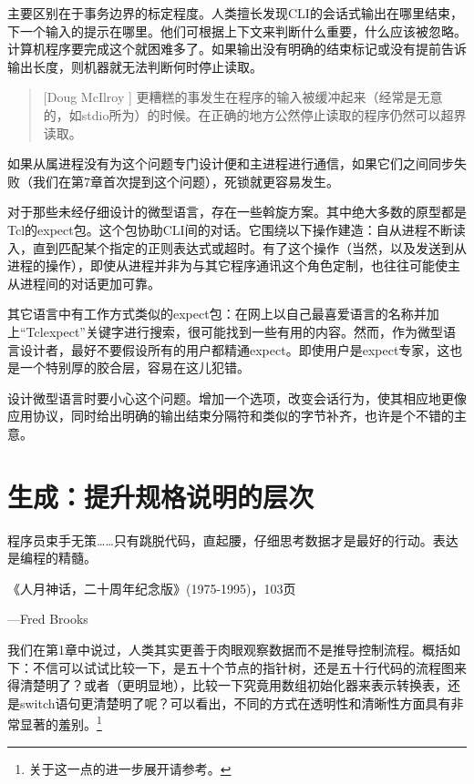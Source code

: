 \documentclass[12pt,oneside]{book}
\begin{document}
主要区别在于事务边界的标定程度。人类擅长发现CLI的会话式输出在哪里结束，下一个输入的提示在哪里。他们可根据上下文来判断什么重要，什么应该被忽略。计算机程序要完成这个就困难多了。如果输出没有明确的结束标记或没有提前告诉输出长度，则机器就无法判断何时停止读取。

\begin{quote}[Doug McIlroy 	]
更糟糕的事发生在程序的输入被缓冲起来（经常是无意的，如stdio所为）的时候。在正确的地方公然停止读取的程序仍然可以超界读取。
\end{quote}

如果从属进程没有为这个问题专门设计便和主进程进行通信，如果它们之间同步失败（我们在第7章首次提到这个问题），死锁就更容易发生。

对于那些未经仔细设计的微型语言，存在一些斡旋方案。其中绝大多数的原型都是Tcl的expect包。这个包协助CLI间的对话。它围绕以下操作建造：自从进程不断读入，直到匹配某个指定的正则表达式或超时。有了这个操作（当然，以及发送到从进程的操作），即使从进程并非为与其它程序通讯这个角色定制，也往往可能使主从进程间的对话更加可靠。

其它语言中有工作方式类似的expect包：在网上以自己最喜爱语言的名称并加上“Tclexpect”关键字进行搜索，很可能找到一些有用的内容。然而，作为微型语言设计者，最好不要假设所有的用户都精通expect。即使用户是expect专家，这也是一个特别厚的胶合层，容易在这儿犯错。

设计微型语言时要小心这个问题。增加一个选项，改变会话行为，使其相应地更像应用协议，同时给出明确的输出结束分隔符和类似的字节补齐，也许是个不错的主意。



\chapter{生成：提升规格说明的层次}
\begin{flushright}
程序员束手无策……只有跳脱代码，直起腰，仔细思考数据才是最好的行动。表达是编程的精髓。

《人月神话，二十周年纪念版》(1975-1995)，103页

{\hfill —Fred Brooks}
\end{flushright}

我们在第1章中说过，人类其实更善于肉眼观察数据而不是推导控制流程。概括如下：不信可以试试比较一下，是五十个节点的指针树，还是五十行代码的流程图来得清楚明了？或者（更明显地），比较一下究竟用数组初始化器来表示转换表，还是switch语句更清楚明了呢？可以看出，不同的方式在透明性和清晰性方面具有非常显著的羞别。\footnote{关于这一点的进一步展开请参考\cite{Bentley}。}
\end{document}
